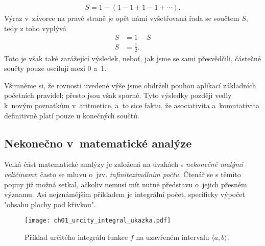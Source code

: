 \begin{align*}
S=1-(1-1+1-1+\cdots ).
\end{align*}
Výraz v~závorce na pravé straně je opět námi vyšetřovaná řada se součtem $S$, tedy z toho vyplývá
\begin{align*}
S&=1-S\\
S&=\frac{1}{2} .
\end{align*}
Toto je však také zarážející výsledek, neboť, jak jsme se sami přesvědčili, částečné součty pouze oscilují mezi 0 a~1.\par
Všimněme si, že rovnosti uvedené výše jsme obdrželi pouhou aplikací základních početních pravidel; přesto jsou však sporné. Tyto výsledky později vedly k~novým poznatkům v~aritmetice, a~to sice faktu, že asociativita a~komutativita definitivně platí pouze u konečných součtů.

\subsection{Nekonečno v~matematické analýze}

Velká část matematické analýzy je založená na úvahách s \emph{nekonečně malými veličinami}; často se mluvu o~jzv. \emph{infinitezimálním počtu}. Čtenář se s těmito pojmy již možná setkal, ačkoliv nemusí mít nutně představu o~jejich přesném významu. Asi nejznámějším příkladem je integrální počet, specificky výpočet "obsahu plochy pod křivkou".
\begin{figure}[H]
	\centering
	\texttt{[image: ch01\_urcity\_integral\_ukazka.pdf]}
	\caption{Příklad určitého integrálu funkce $f$ na uzavřeném intervalu $\langle a,b \rangle$.}
	\label{fig:urcity_integral_ukazka}
\end{figure}

